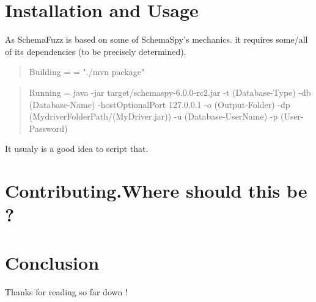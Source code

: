 \documentclass{article}
\begin{document}
	\section{Installation and Usage}	
As SchemaFuzz is based on some of SchemaSpy's mechanics. it requires some/all of its 		dependencies (to be precisely determined). 
		
\begin{quote}
Building =  =  "./mvn package"
\end{quote}


\begin{quote}
	Running = java -jar target/schemaspy-6.0.0-rc2.jar -t (Database-Type) -db (Database-Name) -hostOptionalPort 127.0.0.1 -o (Output-Folder) -dp (MydriverFolderPath/(MyDriver.jar)) -u (Database-UserName) -p (User-Password)
\end{quote}

It usualy is a good idea to script that.
	
	\section{Contributing.Where should this be ?}
	
	\section{Conclusion}
	Thanks for reading so far down !	
	
\end{document}
